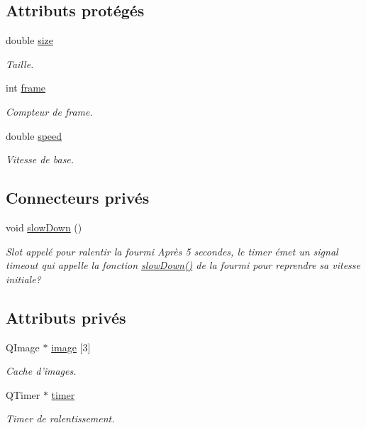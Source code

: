 \subsection*{Attributs protégés}
\begin{DoxyCompactItemize}
\item 
double \hyperlink{classBug_a27a0f0b84d15525e409955509e6e3c42}{size}
\begin{DoxyCompactList}\small\item\em Taille. \end{DoxyCompactList}\item 
int \hyperlink{classBug_ad7e3597cf049f1051be94fcaf2fd3598}{frame}
\begin{DoxyCompactList}\small\item\em Compteur de frame. \end{DoxyCompactList}\item 
double \hyperlink{classBug_a13b95fbf23748ea853b01bfd0b0e7fc8}{speed}
\begin{DoxyCompactList}\small\item\em Vitesse de base. \end{DoxyCompactList}\end{DoxyCompactItemize}
\subsection*{Connecteurs privés}
\begin{DoxyCompactItemize}
\item 
\hypertarget{classAnt_a1261f3d930faf4c98f06e173203a3d72}{
void \hyperlink{classAnt_a1261f3d930faf4c98f06e173203a3d72}{slowDown} ()}
\label{classAnt_a1261f3d930faf4c98f06e173203a3d72}

\begin{DoxyCompactList}\small\item\em Slot appelé pour ralentir la fourmi Après 5 secondes, le timer émet un signal timeout qui appelle la fonction \hyperlink{classAnt_a1261f3d930faf4c98f06e173203a3d72}{slowDown()} de la fourmi pour reprendre sa vitesse initiale? \end{DoxyCompactList}\end{DoxyCompactItemize}
\subsection*{Attributs privés}
\begin{DoxyCompactItemize}
\item 
QImage $\ast$ \hyperlink{classAnt_af7d498fe6677833f371d3d9561727678}{image} \mbox{[}3\mbox{]}
\begin{DoxyCompactList}\small\item\em Cache d'images. \end{DoxyCompactList}\item 
QTimer $\ast$ \hyperlink{classAnt_a0535768a0f4cb7682a13c6cd514cf7b0}{timer}
\begin{DoxyCompactList}\small\item\em Timer de ralentissement. \end{DoxyCompactList}\end{DoxyCompactItemize}


